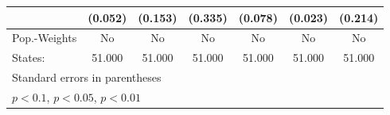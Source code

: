 {\begin{tabular}{l*{6}{c}}
            &     (0.052)         &     (0.153)         &     (0.335)         &     (0.078)         &     (0.023)         &     (0.214)         \\
\hline
Pop.-Weights&          No         &          No         &          No         &          No         &          No         &          No         \\
States:     &      51.000         &      51.000         &      51.000         &      51.000         &      51.000         &      51.000         \\
\hline\hline
\multicolumn{7}{l}{\footnotesize Standard errors in parentheses}\\
\multicolumn{7}{l}{\footnotesize \sym{*} \(p<0.1\), \sym{**} \(p<0.05\), \sym{***} \(p<0.01\)}\\
\end{tabular}
}
